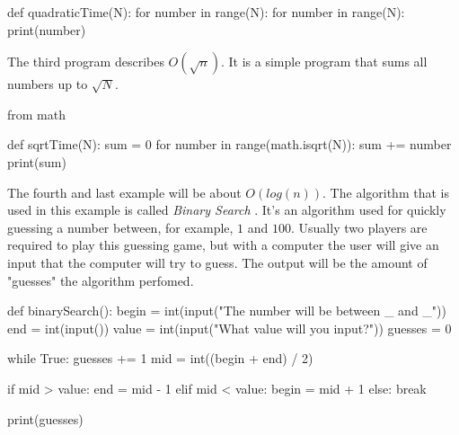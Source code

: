 \documentclass[main.tex]{subfiles}
\begin{document}
\begin{python}
    def quadraticTime(N):
        for number in range(N):
            for number in range(N):
                print(number)
\end{python}

\vspace{10mm}

The third program describes $O(\sqrt{n})$. It is a simple program that sums all numbers up to $\sqrt{N}$.

\begin{python}
    from math

    def sqrtTime(N):
        sum = 0
        for number in range(math.isqrt(N)):
            sum += number
        print(sum)
\end{python}

\vspace{10mm}

The fourth and last example will be about $O(log (n))$. The algorithm that is used in this example is called \textit{Binary Search} \cite{algh:binary_search}. It's an algorithm used for quickly guessing a number between, for example, $1$ and $100$. Usually two players are required to play this guessing game, but with a computer the user will give an input that the computer will try to guess. The output will be the amount of "guesses" the algorithm perfomed.

\begin{python}
    def binarySearch():
        begin = int(input("The number will be between _ and _\n"))
        end = int(input())
        value = int(input("What value will you input?\n"))
        guesses = 0

        while True:
            guesses += 1
            mid = int((begin + end) / 2)

            if mid > value:
                end = mid - 1
            elif mid < value:
                begin = mid + 1
            else:
                break

    print(guesses)

\end{python}

\end{document}
